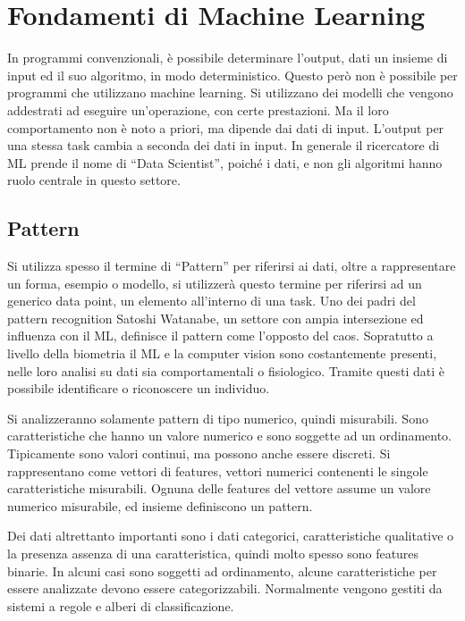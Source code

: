 \documentclass{article}
\numberwithin{equation}{subsection}
\begin{document}
\clearpage

\section{Fondamenti di Machine Learning}

In programmi convenzionali, è possibile determinare l'output, dati un insieme di input ed il 
suo algoritmo, in modo deterministico. Questo però non è possibile per programmi che utilizzano 
machine learning. Si utilizzano dei modelli che vengono addestrati ad eseguire un'operazione, con certe prestazioni. Ma il loro comportamento non è noto a priori, ma dipende dai dati di input. L'output per una stessa task cambia a seconda dei dati in input. 
In generale il ricercatore di ML prende il nome di ``Data Scientist'', poiché i dati, e non 
gli algoritmi hanno ruolo centrale in questo settore. 

\subsection{Pattern}

Si utilizza spesso il termine di ``Pattern'' per riferirsi ai dati, oltre a rappresentare 
un forma, esempio o modello, si utilizzerà questo termine per riferirsi ad un generico 
data point, un elemento all'interno di una task. 
Uno dei padri del pattern recognition Satoshi Watanabe, un settore con ampia intersezione ed influenza con il ML, definisce il pattern come l'opposto del caos. 
Sopratutto a livello della biometria il ML e la computer vision sono costantemente presenti, 
nelle loro analisi su dati sia comportamentali o fisiologico. Tramite questi dati è 
possibile identificare o riconoscere un individuo. 

Si analizzeranno solamente pattern di tipo numerico, quindi misurabili. Sono caratteristiche 
che hanno un valore numerico e sono soggette ad un ordinamento. Tipicamente sono valori continui, ma possono anche essere discreti. Si rappresentano come vettori di features, vettori numerici contenenti le singole caratteristiche misurabili. Ognuna delle features del vettore assume un valore numerico misurabile, ed insieme definiscono un pattern. 

Dei dati altrettanto importanti sono i dati categorici, caratteristiche qualitative o 
la presenza assenza di una caratteristica, quindi molto spesso sono features binarie. In 
alcuni casi sono soggetti ad ordinamento, alcune caratteristiche per essere analizzate devono essere categorizzabili. Normalmente vengono gestiti da sistemi a regole e alberi di 
classificazione. 
\end{document}

